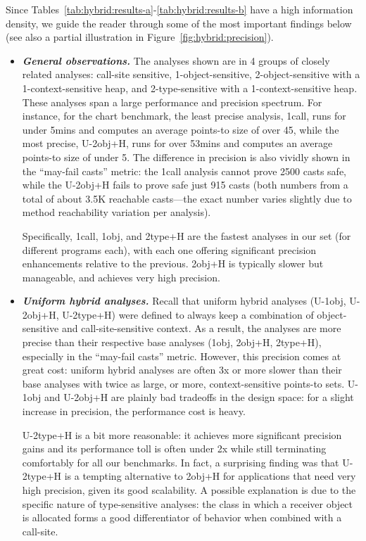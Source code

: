 \begin{table}
\label{tab:hybrid:results-b}
\end{table}

Since Tables~\ref{tab:hybrid:results-a}-\ref{tab:hybrid:results-b} have a high information density, we guide the reader through some of the most important findings below (see also a partial illustration in Figure~\ref{fig:hybrid:precision}).

\begin{itemize}
\item \textbf{\emph{General observations.}}
The analyses shown are in 4 groups of closely related analyses: call-site sensitive, 1-object-sensitive, 2-object-sensitive with a 1-context-sensitive heap, and 2-type-sensitive with a 1-context-sensitive heap. These analyses span a large performance and precision spectrum. For instance, for the chart benchmark, the least precise analysis, 1call, runs for under 5mins and computes an average points-to size of over 45, while the most precise, U-2obj+H, runs for over 53mins and computes an average points-to size of under 5. The difference in precision is also vividly shown in the ``may-fail casts'' metric: the 1call analysis cannot prove 2500 casts safe, while the U-2obj+H fails to prove safe just 915 casts (both numbers from a total of about 3.5K reachable casts---the exact number varies slightly due to method reachability variation per analysis). 

Specifically, 1call, 1obj, and 2type+H are the fastest analyses in our set (for different programs each), with each one offering significant precision enhancements relative to the previous. 2obj+H is typically slower but manageable, and achieves very high precision.

\item \textbf{\emph{Uniform hybrid analyses.}}
Recall that uniform hybrid analyses (U-1obj, U-2obj+H, U-2type+H) were defined to always keep a combination of object-sensitive and call-site-sensitive context. As a result, the analyses are more precise than their respective base analyses (1obj, 2obj+H, 2type+H), especially in the ``may-fail casts'' metric. However, this precision comes at great cost: uniform hybrid analyses are often 3x or more slower than their base analyses with twice as large, or more, context-sensitive points-to sets. U-1obj and U-2obj+H are plainly bad tradeoffs in the design space: for a slight increase in precision, the performance cost is heavy.

U-2type+H is a bit more reasonable: it achieves more significant precision gains and its performance toll is often under 2x while still terminating comfortably for all our benchmarks. In fact, a surprising finding was that U-2type+H is a tempting alternative to 2obj+H for applications that need very high precision, given its good scalability. A possible explanation is due to the specific nature of type-sensitive analyses: the class in which a receiver object is allocated forms a good differentiator of behavior when combined with a call-site.


\end{itemize}
